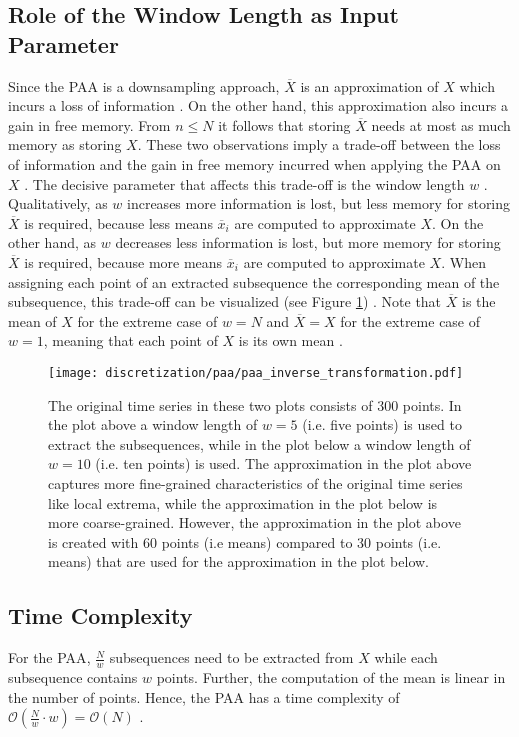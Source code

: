 \subsection*{Role of the Window Length as Input Parameter} \label{parameter_window_length}
Since the \ac{PAA} is a downsampling approach, $\overline{X}$ is an approximation of $X$ which incurs a loss of information \cite{PAA_Yi_Faloutsos}. On the other hand, this approximation also incurs a gain in free memory. From $n \leq N$ it follows that storing $\overline{X}$ needs at most as much memory as storing $X$. These two observations imply a trade-off between the loss of information and the gain in free memory incurred when applying the \ac{PAA} on $X$ \cite{SAX_Lin}. \newline
The decisive parameter that affects this trade-off is the window length $w$ \cite{SAX_Lin}. Qualitatively, as $w$ increases more information is lost, but less memory for storing $\overline{X}$ is required, because less means $\overline{x}_i$ are computed to approximate $X$. On the other hand, as $w$ decreases less information is lost, but more memory for storing $\overline{X}$ is required, because more means $\overline{x}_i$ are computed to approximate $X$. When assigning each point of an extracted subsequence the corresponding mean of the subsequence, this trade-off can be visualized (see Figure \ref{fig:PAA_inverse}) \cite{SAX_Lin}. \newline
Note that $\overline{X}$ is the mean of $X$ for the extreme case of $w = N$ and $\overline{X} = X$ for the extreme case of $w = 1$, meaning that each point of $X$ is its own mean \cite{PAA_Keogh}.
\begin{figure}[htb]
\centering
\texttt{[image: discretization/paa/paa\_inverse\_transformation.pdf]}
\caption[Piecewise Aggregate Approximation - Effect of Window Size]{The original time series in these two plots consists of 300 points. In the plot above a window length of $w = 5$ (i.e. five points) is used to extract the subsequences, while in the plot below a window length of $w = 10$ (i.e. ten points) is used. The approximation in the plot above captures more fine-grained characteristics of the original time series like local extrema, while the approximation in the plot below is more coarse-grained. However, the approximation in the plot above is created with 60 points (i.e means) compared to 30 points (i.e. means) that are used for the approximation in the plot below.} 
\label{fig:PAA_inverse}
\end{figure}
\subsection*{Time Complexity}
For the \ac{PAA}, $\frac{N}{w}$ subsequences need to be extracted from $X$ while each subsequence contains $w$ points. Further, the computation of the mean is linear in the number of points. Hence, the \ac{PAA} has a time complexity of $\mathcal{O}(\frac{N}{w}\cdot w) = \mathcal{O}(N)$ \cite{PAA_Keogh}.
